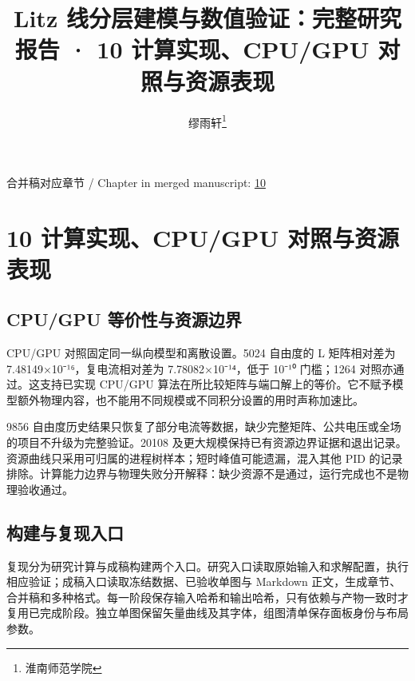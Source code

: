 \documentclass[journal,10pt]{IEEEtran}
\begin{document}
\title{Litz 线分层建模与数值验证：完整研究报告 · 10 计算实现、CPU/GPU 对照与资源表现}
\author{缪雨轩\thanks{淮南师范学院}}

\maketitle
\noindent 合并稿对应章节 / Chapter in merged manuscript: \href{report_zh-CN_ieee.pdf#chapter-10}{10}\par
\FloatBarrier
\section*{10 计算实现、CPU/GPU 对照与资源表现}
\hypertarget{chapter-10}{}
\subsection*{CPU/GPU 等价性与资源边界}
\hypertarget{10.compute.heading}{}
CPU/GPU 对照固定同一纵向模型和离散设置。5024 自由度的 L 矩阵相对差为 7.48149×10⁻¹⁶，复电流相对差为 7.78082×10⁻¹⁴，低于 10⁻¹⁰ 门槛；1264 对照亦通过。这支持已实现 CPU/GPU 算法在所比较矩阵与端口解上的等价。它不赋予模型额外物理内容，也不能用不同规模或不同积分设置的用时声称加速比。


9856 自由度历史结果只恢复了部分电流等数据，缺少完整矩阵、公共电压或全场的项目不升级为完整验证。20108 及更大规模保持已有资源边界证据和退出记录。资源曲线只采用可归属的进程树样本；短时峰值可能遗漏，混入其他 PID 的记录排除。计算能力边界与物理失败分开解释：缺少资源不是通过，运行完成也不是物理验收通过。


\subsection*{构建与复现入口}
\hypertarget{10.workflow.heading}{}
复现分为研究计算与成稿构建两个入口。研究入口读取原始输入和求解配置，执行相应验证；成稿入口读取冻结数据、已验收单图与 Markdown 正文，生成章节、合并稿和多种格式。每一阶段保存输入哈希和输出哈希，只有依赖与产物一致时才复用已完成阶段。独立单图保留矢量曲线及其字体，组图清单保存面板身份与布局参数。
\end{document}
